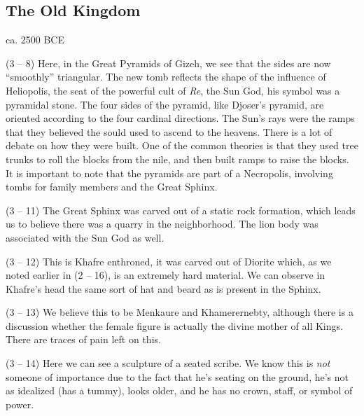 \documentclass{article}
\begin{document}
\begin{spacing}{1.2}
    \subsection{The Old Kingdom}
    \begin{flushright}
        ca. 2500 BCE
    \end{flushright}
    (3 -- 8) Here, in the Great Pyramids of Gizeh, we see that the sides are 
    now ``smoothly'' triangular. The new tomb reflects the shape of the 
    influence of Heliopolis, the seat of the powerful cult of \emph{Re}, the 
    Sun God, his symbol was a pyramidal stone. The four sides of the pyramid, 
    like Djoser's pyramid, are oriented according to the four cardinal 
    directions. The Sun's rays were the ramps that they believed the sould used 
    to ascend to the heavens. There is a lot of debate on how they were built. 
    One of the common theories is that they used tree trunks to roll the blocks 
    from the nile, and then built ramps to raise the blocks. It is important to note that the pyramids are part of a Necropolis, involving tombs for family members and the Great Sphinx.

    (3 -- 11) The Great Sphinx was carved out of a static rock formation, which 
    leads us to believe there was a quarry in the neighborhood. The lion body 
    was associated with the Sun God as well.
    
    (3 -- 12) This is Khafre enthroned, it was carved out of Diorite which, as 
    we noted earlier in (2 -- 16), is an extremely hard material. We can 
    observe in Khafre's head the same sort of hat and beard as is present in 
    the Sphinx.

    (3 -- 13) We believe this to be Menkaure and Khamerernebty, although there 
    is a discussion whether the female figure is actually the divine mother of 
    all Kings. There are traces of pain left on this.

    (3 -- 14) Here we can see a sculpture of a seated scribe. We know this is \emph{not} someone of importance due to the fact that he's seating on the ground, he's not as idealized (has a tummy), looks older, and he has no crown, staff, or symbol of power.
\end{spacing}
    
\end{document}
